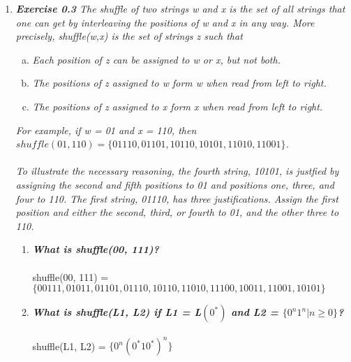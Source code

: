 \documentclass[a4paper]{article}
\begin{document}
\begin{enumerate}
\item \emph{\textbf{Exercise 0.3} The shuffle of two strings w and x is the set of all strings that one can get by interleaving the positions of w and x in any way. More precisely, shuffle(w,x) is the set of strings z such that}
\begin{enumerate}[(a)]
\item \emph{Each position of z can be assigned to w or x, but not both.}
\item \emph{The positions of z assigned to w form w when read from left to right.
}
\item \emph{The positions of z assigned to x form x when read from left to right.} 
\end{enumerate}
\emph{For example, if w = 01 and x = 110, then $shuffle(01, 110) = \{01110, 01101, 10110, 10101, 11010, 11001\}$. \\
\\
To illustrate the necessary reasoning, the fourth string, 10101, is justfied by assigning the second and fifth positions to 01 and positions one, three, and four to 110. The first string, 01110, has three justifications. Assign the first position and either the second, third, or fourth to 01, and the other
three to 110.}
\begin{enumerate}[1.]
\item \textbf{\emph{What is shuffle(00, 111)?}} \\
\\ 
shuffle(00, 111) = $\{00111, 01011, 01101, 01110, 10110, 11010, 11100, 10011, 11001, 10101\}$ \\



\item \textbf{\emph{What is shuffle(L1, L2) if L1 = L$(0^\ast)$ and L2 = $\{0^n1^n| n\geq 0\}$?}} \\
\\ 
shuffle(L1, L2) = $\{0^n(0^\ast10^\ast)^n\}$ \\




\end{enumerate}
\end{enumerate}
\end{document}
